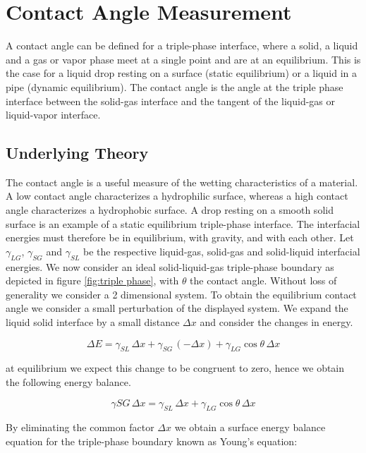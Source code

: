 \section{Contact Angle Measurement}

A contact angle can be defined for a triple-phase interface, where a solid, a liquid and a gas or vapor phase meet at a single point and are at an equilibrium. This is the case for a liquid drop resting on a surface (static equilibrium) or a liquid in a pipe (dynamic equilibrium). The contact angle is the angle at the triple phase interface between the solid-gas interface and the tangent of the liquid-gas or liquid-vapor interface.

\subsection{Underlying Theory}

The contact angle is a useful measure of the wetting characteristics of a material. A low contact angle characterizes a hydrophilic surface, whereas a high contact angle characterizes a hydrophobic surface. 
A drop resting on a smooth solid surface is an example of a static equilibrium triple-phase interface. The interfacial energies must therefore be in equilibrium, with gravity, and with each other. Let $\gamma_{LG}$, $\gamma_{SG}$ and $\gamma_{SL}$ be the respective liquid-gas, solid-gas and solid-liquid interfacial energies. We now consider an ideal solid-liquid-gas triple-phase boundary as depicted in figure \ref{fig:triple phase}, with $\theta$ the contact angle. Without loss of generality we consider a 2 dimensional system. To obtain the equilibrium contact angle we consider a small perturbation of the displayed system. We expand the liquid solid interface by a small distance $\Delta x$ and consider the changes in energy.

\begin{equation}
\Delta E = \gamma_{SL}\, \Delta x + \gamma_{SG} \, ( - \Delta x) + \gamma_{LG} \cos{\theta} \, \Delta x
\end{equation}

at equilibrium we expect this change to be congruent to zero, hence we obtain the following energy balance.

\begin{equation}
\gamma{SG} \, \Delta x = \gamma_{SL} \, \Delta x + \gamma_{LG} \cos{\theta}\, \Delta x
\end{equation}

By eliminating the common factor $\Delta x$ we obtain a surface energy balance equation for the triple-phase boundary known as Young's equation:


